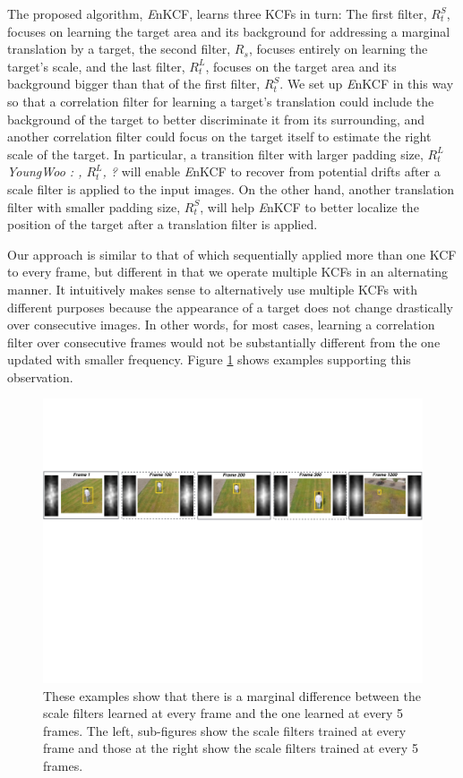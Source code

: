 \documentclass[10pt,twocolumn,letterpaper]{article}
\begin{document}
The proposed algorithm, {\it E}nKCF, learns three KCFs in turn: The
first filter, $R_{t}^{S}$, focuses on learning the target area and its
background for addressing a marginal translation by a target, the
second filter, $R_{s}$, focuses entirely on learning the target's
scale, and the last filter, $R_{t}^{L}$, focuses on the target area
and its background bigger than that of the first filter,
$R_{t}^{S}$. We set up {\it E}nKCF in this way so that a correlation
filter for learning a target's translation could include the
background of the target to better discriminate it from its
surrounding, and another correlation filter could focus on the target
itself to estimate the right scale of the target. In particular, a
transition filter with larger padding size, $R_{t}^{L}$ \textit{YoungWoo : , $R_{t}^{L}$, ?} 
will enable {\it E}nKCF to recover from potential drifts after a scale filter is
applied to the input images. On the other hand, another translation filter with
smaller padding size, $R_{t}^{S}$, will help {\it E}nKCF to better
localize the position of the target after a translation filter is
applied.

Our approach is similar to that of \cite{ma2015long} which
sequentially applied more than one KCF to every frame, but different
in that we operate multiple KCFs in an alternating manner. It
intuitively makes sense to alternatively use multiple KCFs with
different purposes because the appearance of a target does not change
drastically over consecutive images. In other words, for most cases,
learning a correlation filter over consecutive frames would not be
substantially different from the one updated with smaller
frequency. Figure \ref{fig:Filters_Comparison} shows examples
supporting this observation.

\begin{figure}[!h]
\centering
\includegraphics[width=1\textwidth]{./figures/LearnedFiltersComparison2.pdf}
\caption{These examples show that there is a marginal difference
  between the scale filters learned at every frame and the one learned
  at every 5 frames. The left, sub-figures show the scale filters
  trained at every frame and those at the right show the scale filters
  trained at every 5 frames.}
\label{fig:Filters_Comparison}
\end{figure}
\end{document}
